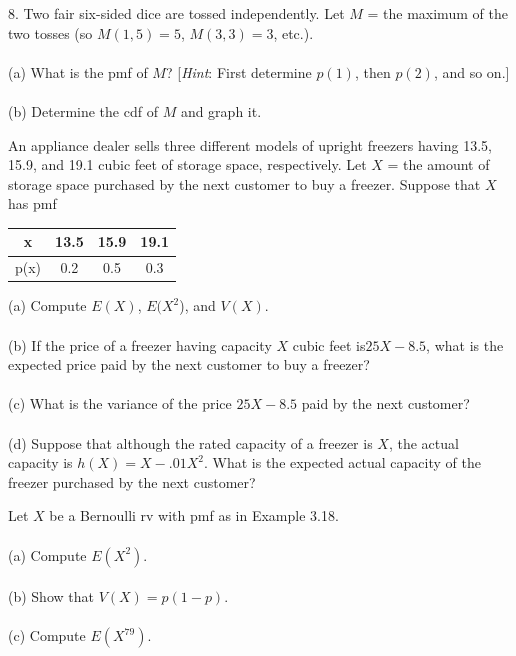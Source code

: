 \documentclass[12pt,letterpaper]{hmcpset}
\begin{document}
\begin{solution}

\end{solution}
\newpage
\begin{problem}[3.2.18]
8. Two fair six-sided dice are tossed independently. Let $M$ = the maximum
of the two tosses (so $M(1,5) = 5$, $M(3,3) = 3$, etc.).\\
\\(a) What is the pmf of $M$? [\textit{Hint}: First determine $p(1)$, then
$p(2)$, and so on.]\\
\\(b) Determine the cdf of $M$ and graph it.

\end{problem}

\begin{solution}

\end{solution}
\newpage

\begin{problem}[3.3.32]
An appliance dealer sells three different models of upright
freezers having 13.5, 15.9, and 19.1 cubic feet of storage
space, respectively. Let $X$ = the amount of storage space
purchased by the next customer to buy a freezer. Suppose
that $X$ has pmf
\begin{center}
	\begin{tabular}{c|c c c}
		 x & 13.5 & 15.9 & 19.1\\
 		\hline
 		p(x) & 0.2 & 0.5 & 0.3 \\
	 \end{tabular}
\end{center}
(a) Compute $E(X)$, $E(X^2$), and $V(X)$.\\
\\(b) If the price of a freezer having capacity $X$ cubic feet is$25X - 8.5$, what is the expected price paid by the next
customer to buy a freezer?\\
\\(c) What is the variance of the price $25X - 8.5$ paid by the
next customer?\\
\\(d) Suppose that although the rated capacity of a freezer is $X$, the actual capacity is $h(X) = X - .01X^2$. What is the expected actual capacity of the freezer purchased by the
next customer?
\end{problem}

\begin{solution}

\end{solution}
\newpage
\begin{problem}[3.3.33]
Let $X$ be a Bernoulli rv with pmf as in Example 3.18.\\
\\(a) Compute $E(X^2)$.\\
\\(b) Show that $V(X) = p(1-p)$.\\
\\(c) Compute $E(X^{79})$.
\end{problem}
\end{document}
